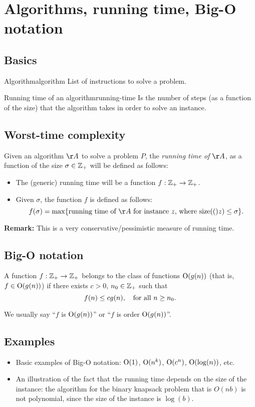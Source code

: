 \section{Algorithms, running time, Big-O notation}
\subsection{Basics}
\begin{definition}{Algorithm}{algorithm}
List of instructions to solve a problem.
\end{definition}

	
\begin{definition}{Running time of an algorithm}{running-time}
Is the number of steps (as a function of the size) that the algorithm takes in order to solve an instance. 
\end{definition}


	
	

\subsection{Worst-time complexity}	

Given an algorithm $\AA$ to solve a problem $P$, the {\em running time of $\AA$}, as a function of the size $\sigma\in{\mathbb{Z}}_+$ will be defined as follows:
\begin{itemize}
	\item The (generic) running time will be a function $f:{\mathbb{Z}}_+\rightarrow{\mathbb{Z}}_+$.
   \item Given $\sigma$, the function $f$ is defined as follows:
		$$f(\sigma)=\max\{\textup{running time of $\AA$ for instance $z$, where $\size(z)\leq \sigma$}\}.$$
\end{itemize}
	
{\bf Remark:} This is a very conservative/pessimistic measure of running time.	
\subsection{Big-O notation}

A function 	$f:{\mathbb{Z}}_+\rightarrow{\mathbb{Z}}_+$ belongs to the class of functions $\textup{O}(g(n))$ (that is, $f\in\textup{O}(g(n))$) if there exists $c>0$, $n_0\in{\mathbb{Z}}_+$ such that
$$f(n)\leq c g(n),\quad \textup{for all}\ n\geq n_0.$$

We usually say ``$f$ is $\textup{O}(g(n))$'' or ``$f$ is order $\textup{O}(g(n))$''.
	\subsection{Examples} 
\begin{itemize}
  \item Basic examples of Big-O notation: $\textup{O}(1)$, $\textup{O}(n^k)$, $\textup{O}(c^n)$, $\textup{O}(\log(n))$, etc.
	\item An illustration of the fact that the running time depends on the size of the instance: the algorithm for the binary knapsack problem that is $O(nb)$ is not polynomial, since the size of the instance is $\log(b)$.
\end{itemize}	
 




